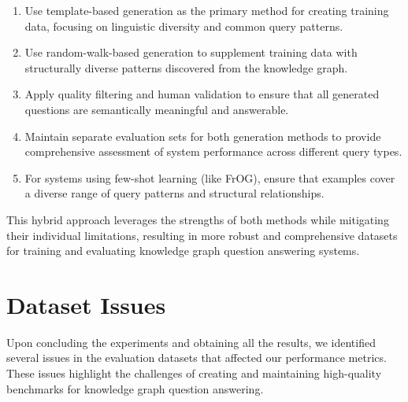 \begin{enumerate}
    \item Use template-based generation as the primary method for creating training data, focusing on linguistic diversity and common query patterns.
    
    \item Use random-walk-based generation to supplement training data with structurally diverse patterns discovered from the knowledge graph.
    
    \item Apply quality filtering and human validation to ensure that all generated questions are semantically meaningful and answerable.
    
    \item Maintain separate evaluation sets for both generation methods to provide comprehensive assessment of system performance across different query types.
    
    \item For systems using few-shot learning (like FrOG), ensure that examples cover a diverse range of query patterns and structural relationships.
\end{enumerate}

This hybrid approach leverages the strengths of both methods while mitigating their individual limitations, resulting in more robust and comprehensive datasets for training and evaluating knowledge graph question answering systems.

\section{Dataset Issues}
Upon concluding the experiments and obtaining all the results, we identified several issues in the evaluation datasets that affected our performance metrics. These issues highlight the challenges of creating and maintaining high-quality benchmarks for knowledge graph question answering.

